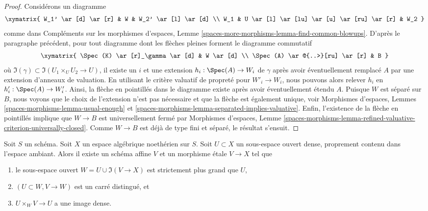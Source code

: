 \begin{proof}
\medskip\noindent
Considérons un diagramme
$$
\xymatrix{
W_1' \ar[d] \ar[r] & W & W_2' \ar[l] \ar[d] \\
W_1 & U \ar[l] \ar[lu] \ar[u] \ar[ru] \ar[r] & W_2
}
$$
comme dans Compléments sur les morphismes d'espaces, Lemme
\ref{spaces-more-morphisms-lemma-find-common-blowups}.
D'après le paragraphe précédent, pour tout diagramme dont les flèches pleines forment le diagramme commutatif
$$
\xymatrix{
\Spec(K) \ar[r]_\gamma  \ar[d] & W \ar[d] \\
\Spec(A) \ar@{..>}[ru] \ar[r] & B
}
$$
où $\Im(\gamma) \subset \Im(U_1 \times_U U_2 \to U)$,
il existe un $i$ et une extension $h_i : \Spec(A) \to W_i$ de $\gamma$
après avoir éventuellement remplacé $A$ par une extension d'anneaux de valuation.
En utilisant le critère valuatif de propreté pour $W'_i \to W_i$,
nous pouvons alors relever $h_i$ en $h'_i : \Spec(A) \to W'_i$.
Ainsi, la flèche en pointillés dans le diagramme existe après
avoir éventuellement étendu $A$. Puisque $W$ est séparé sur $B$,
nous voyons que le choix de l'extension n'est pas nécessaire et que la flèche est également unique, voir
Morphismes d'espaces, Lemmes \ref{spaces-morphisms-lemma-usual-enough}
et \ref{spaces-morphisms-lemma-separated-implies-valuative}.
Enfin, l'existence de la flèche en pointillés
implique que $W \to B$ est universellement fermé par Morphismes d'espaces, Lemme \ref{spaces-morphisms-lemma-refined-valuative-criterion-universally-closed}. Comme $W \to B$ est déjà de type fini et séparé, le résultat s'ensuit. 
\end{proof}

\begin{lemma}
\label{lemma-filter-Noetherian-space}
Soit $S$ un schéma. Soit $X$ un espace algébrique noethérien sur $S$.
Soit $U \subset X$ un sous-espace ouvert dense, proprement contenu dans l'espace ambiant. Alors il existe un
schéma affine $V$ et un morphisme \'etale $V \to X$ tel que
\begin{enumerate}
\item le sous-espace ouvert $W = U \cup \Im(V \to X)$ est strictement plus grand
que $U$,
\item $(U \subset W, V \to W)$ est un carré distingué, et
\item $U \times_W V \to U$ a une image dense.
\end{enumerate}
\end{lemma}

